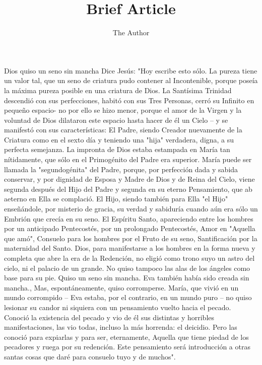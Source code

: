 \documentclass[12pt]{book} %
\title{Brief Article}
\author{The Author}
\begin{document}
\maketitle
Dios quiso un seno sin mancha
 	Dice Jesús: 
"Hoy escribe esto sólo. La pureza tiene un valor tal, que un seno de criatura pudo contener al Incontenible, porque 
poseía la máxima pureza posible en una criatura de Dios. 
La Santísima Trinidad descendió con sus perfecciones, habitó con sus Tres Personas, cerró su Infinito en pequeño 
espacio- no por ello se hizo menor, porque el amor de la Virgen y la voluntad de Dios dilataron este espacio hasta hacer de él un Cielo – y se manifestó con sus características: 
El Padre, siendo Creador nuevamente de la Criatura como en el sexto día y teniendo una "hija" verdadera, digna, a su 
perfecta semejanza. La impronta de Dios estaba estampada en María tan nítidamente, que sólo en el Primogénito del Padre era superior. María puede ser llamada la "segundogénita" del Padre, porque, por perfección dada y sabida conservar, y por dignidad de Esposa y Madre de Dios y de Reina del Cielo, viene segunda después del Hijo del Padre y segunda en su eterno Pensamiento, que ab aeterno en Ella se complació. 
El Hijo, siendo también para Ella "el Hijo" enseñándole, por misterio de gracia, su verdad y sabiduría cuando aún era 
sólo un Embrión que crecía en su seno. 
El Espíritu Santo, apareciendo entre los hombres por un anticipado Pentecostés, por un prolongado Pentecostés, Amor 
en "Aquella que amó", Consuelo para los hombres por el Fruto de su seno, Santificación por la maternidad del Santo. 
Dios, para manifestarse a los hombres en la forma nueva y completa que abre la era de la Redención, no eligió como 
trono suyo un astro del cielo, ni el palacio de un grande. No quiso tampoco las alas de los ángeles como base para su pie. Quiso un seno sin mancha. 
Eva también había sido creada sin mancha., Mas, espontáneamente, quiso corromperse. María, que vivió en un mundo corrompido – Eva estaba, por el contrario, en un mundo puro – no quiso lesionar su candor ni siquiera con un pensamiento vuelto hacia el pecado. Conoció la existencia del pecado y vio de él sus distintas y horribles manifestaciones, las vio todas, incluso la más horrenda: el deicidio. Pero las conoció para expiarlas y para ser, eternamente, Aquella que tiene piedad de los pecadores y ruega por su redención. 
Este pensamiento será introducción a otras santas cosas que daré para consuelo tuyo y de muchos". 
 
\end{document}
